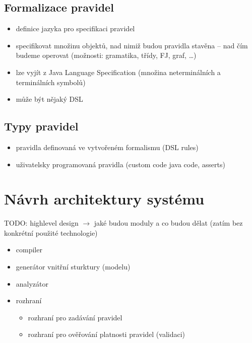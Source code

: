 
\subsection{Formalizace pravidel}

\begin{itemize}
\item definice jazyka pro specifikaci pravidel
\item specifikovat množinu objektů, nad nimiž budou pravidla stavěna -- nad čím budeme operovat (možnosti: gramatika, třídy, FJ, graf, \ldots)
\item lze vyjít z Java Language Specification (množina neterminálních a terminálních symbolů)
\item může být nějaký DSL
\end{itemize}

\subsection{Typy pravidel}
\begin{itemize}
\item pravidla definovaná ve vytvořeném formalismu (DSL rules)
\item uživatelsky programovaná pravidla (custom code java code, asserts)
\end{itemize}

\section{Návrh architektury systému}
TODO: highlevel design $\rightarrow$ jaké budou moduly a co budou dělat (zatím bez konkrétní použité technologie)

\begin{itemize}
\item compiler
\item generátor vnitřní sturktury (modelu)
\item analyzátor
\item rozhraní
  \begin{itemize}
  \item rozhraní pro zadávání pravidel
  \item rozhraní pro ověřování platnosti pravidel (validaci)
  \end{itemize}
\end{itemize}

